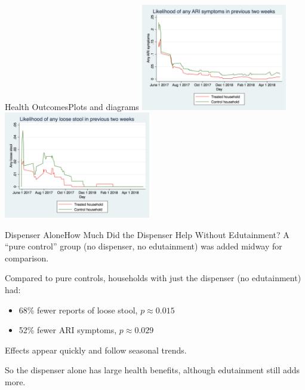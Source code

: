 \documentclass[aspectratio=169]{beamer}
\begin{document}
\begin{frame}{Health Outcomes}{Plots and diagrams}
	\includegraphics[width=0.48\textwidth]{img-004.png}
	\includegraphics[width=0.48\textwidth]{img-006.png}
\end{frame}

\begin{frame}{Dispenser Alone}{How Much Did the Dispenser Help Without Edutainment?}
	A “pure control” group (no dispenser, no edutainment) was added midway for comparison.

	Compared to pure controls, households with just the dispenser (no edutainment) had:
	\begin{itemize}
		\item 68\% fewer reports of loose stool, $p \approx 0.015$
		\item 52\% fewer ARI symptoms, $p \approx 0.029$
	\end{itemize}

	Effects appear quickly and follow seasonal trends.

	So the dispenser alone has large health benefits, although edutainment still adds more.
\end{frame}
\end{document}
